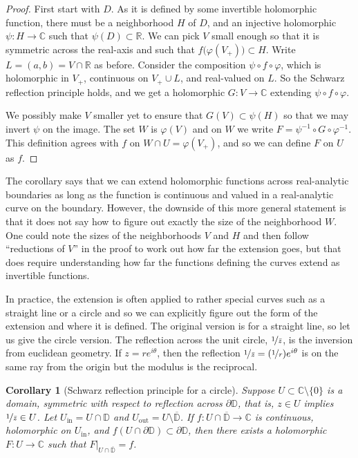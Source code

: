 \documentclass[12pt,openany]{book}
\newcommand{\C}{{\mathbb{C}}}
\newcommand{\R}{{\mathbb{R}}}
\newcommand{\D}{{\mathbb{D}}}
\newcommand{\myquote}[1]{``#1''}
\theoremstyle{plain}
\newtheorem{cor}[thm]{Corollary}
\theoremstyle{remark}
\theoremstyle{definition}
\theoremstyle{exercise}
\theoremstyle{example}
\begin{document}
\begin{proof}
First start with $D$.  As it is defined by some invertible holomorphic
function,
there must be a neighborhood $H$ of $D$, and an injective
holomorphic $\psi \colon H \to \C$ such that $\psi(D) \subset \R$.
We can pick $V$ small enough so that it is symmetric across the real-axis
and such that $f\bigl(\varphi(V_+)\bigr) \subset H$.
Write $L = (a,b) = V \cap \R$ as before.
Consider the composition $\psi \circ f \circ \varphi$, which is
holomorphic in $V_+$, continuous on $V_+ \cup L$, and
real-valued on $L$.  So the Schwarz reflection principle holds,
and we get a holomorphic $G \colon V \to \C$ extending
$\psi \circ f \circ \varphi$.

We possibly make $V$ smaller yet to ensure that $G(V) \subset \psi(H)$ so that
we may invert $\psi$ on the image.
The set $W$ is $\varphi(V)$ and on $W$
we write $F = \psi^{-1} \circ G \circ \varphi^{-1}$.  This definition
agrees with $f$ on $W \cap U = \varphi(V_+)$, and so we can define $F$ on $U$ as $f$.
\end{proof}

The corollary says that we can extend holomorphic functions across
real-analytic boundaries as long as the function is continuous and valued in
a real-analytic curve on the boundary.  However, the downside of this more
general statement is that it
does not say how to figure out exactly the size of the neighborhood $W$.
One could note the sizes of the neighborhoods $V$ and $H$
and then follow \myquote{reductions of $V$} in the proof to work out how far
the extension goes, but that does require understanding how far the
functions defining the curves extend as invertible functions.

In practice, the extension is often applied to rather special curves such as
a straight line or a circle and so we can
explicitly figure out the form of the extension and where it is defined.
The original version is for a
straight line, so let us give the circle version.
The reflection across the unit circle, $\nicefrac{1}{\bar{z}}$, is the inversion from
euclidean geometry.
If $z = re^{i\theta}$, then the reflection
$\nicefrac{1}{\bar{z}} = (\nicefrac{1}{r}) e^{i\theta}$ is on the same ray from
the origin but the modulus is the reciprocal.

\begin{cor}[Schwarz reflection principle for a circle]
\label{thm:schwarzreflectioncircleholo}
Suppose $U \subset \C \setminus \{ 0 \}$ is a domain,
symmetric with respect to reflection across $\partial \D$,
that is, $z \in U$ implies $\nicefrac{1}{\bar{z}} \in U$.
Let $U_{\text{in}} = U \cap \D$ and $U_{\text{out}} = U \setminus \overline{\D}$.
If $f \colon U \cap \overline{\D} \to \C$ is continuous,
holomorphic on $U_{\text{in}}$,
and $f(U \cap \partial \D) \subset \partial \D$,
then there exists a holomorphic $F \colon U \to \C$ such that
$F|_{U \cap \overline{\D}} = f$.
\end{cor}
\end{document}

